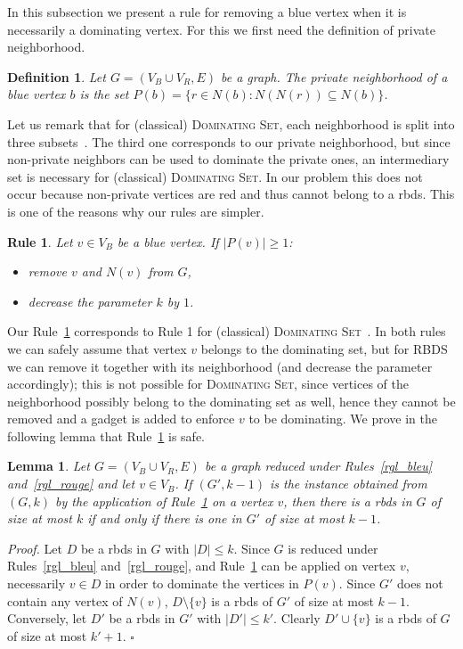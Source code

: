 \documentclass[a4paper,11pt]{article}
\newtheorem{lem}  {Lemma}
\newtheorem{rgl}  {Rule}
\newtheorem{defi} {Definition}
\newcommand{\rrgl}   [1] {Rule~\ref{#1}\xspace}
\newcommand{\dom}    [0] {\textsc{Dominating Set}\xspace}
\newcommand{\drb}    [0] {rbds\xspace}
\newcommand{\RBDS}{\textsc{RBDS}\xspace}
\newenvironment{proof}{\noindent \textit{Proof. }}{\hfill$\square$\vspace{.2cm}}
\begin{document}
In this subsection we present a rule for removing a blue vertex when it is necessarily a dominating vertex. For this we first need the definition of private neighborhood.

\begin{defi}
Let $G=(V_B\cup V_R,E)$ be a graph.
The \emph{private neighborhood} of a blue vertex $b$ is the set $P(b) = \{r \in N(b) : N(N(r)) \subseteq N(b) \}$.
\end{defi}

Let us remark that for (classical) \dom, each neighborhood is split into three subsets~\cite{AFN04}. The third one corresponds to our private neighborhood, but since non-private neighbors can be used to dominate the private ones, an intermediary set is necessary for (classical) \dom. In our problem this does not occur because non-private vertices are red and thus cannot belong to a \drb. This is one of the reasons why our rules are simpler.

\begin{rgl}  \label{rgl_som}
Let $v \in V_B$ be a blue vertex. If $|P(v)| \geq 1$:
\begin{itemize}\itemsep0em
\item remove $v$ and $N(v)$ from $G$,
\item decrease the parameter $k$ by $1$.
\end{itemize}

\end{rgl}

Our \rrgl{rgl_som} corresponds to Rule 1 for (classical) \dom~\cite{AFN04}. In both rules we can safely assume that vertex $v$ belongs to the dominating set, but for \RBDS we can remove it together with its neighborhood (and decrease the parameter accordingly); this is not possible for \dom, since vertices of the neighborhood possibly belong to the dominating set as well, hence they cannot be removed and a gadget is added to enforce $v$ to be dominating. We prove in the following lemma that \rrgl{rgl_som} is safe.

\begin{lem} \label{lem_corr_1}
Let $G=(V_B\cup V_R,E)$ be a graph reduced under Rules~\ref{rgl_bleu} and~\ref{rgl_rouge} and let $v \in V_B$.
If $(G',k-1)$ is the instance obtained from $(G,k)$ by the application of \rrgl{rgl_som} on a vertex $v$,
then there is a \drb in $G$ of size at most $k$ if and only if there is one in $G'$ of size at most $k-1$.
\end{lem}

\begin{proof}
Let $D$ be a \drb in $G$ with $|D| \leq k$. Since $G$ is reduced under Rules~\ref{rgl_bleu}  and~\ref{rgl_rouge}, and \rrgl{rgl_som} can be applied on vertex $v$, necessarily $v \in D$ in order to dominate the vertices in $P(v)$. Since $G'$ does not contain any vertex of $N(v)$, $D\setminus\{v\}$ is a \drb of $G'$ of size at most $k-1$.
Conversely, let $D'$ be a \drb in $G'$ with $|D'| \leq k'$. Clearly $D' \cup \{v\}$ is a \drb of $G$ of size at most $k'+1$.
\end{proof}
\end{document}

